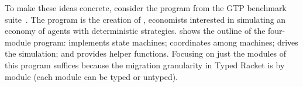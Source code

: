 To make these ideas concrete, consider the  program from the GTP benchmark
suite~\cite{gtnffvf-jfp-2019,g-rep-2023}. The program is the creation of \citet{fsm},
economists interested in simulating an economy of agents with deterministic
strategies.  shows the outline of the four-module
program:  implements state machines;  coordinates among
machines;  drives the simulation;
and  provides helper functions.  Focusing on
just the modules of this program suffices because the migration granularity
in Typed Racket is by module (each module can be typed or untyped).


